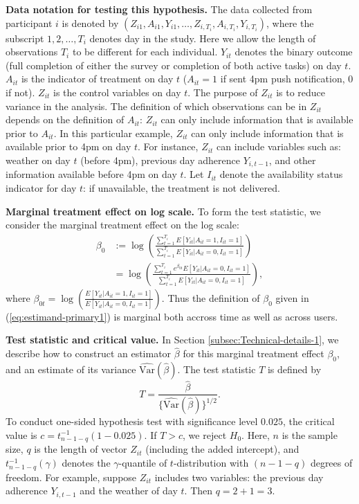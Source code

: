 \documentclass[11pt]{article}
\begin{document}
\textbf{Data notation for testing this hypothesis.} The data collected
from participant $i$ is denoted by $(Z_{i1},A_{i1},Y_{i1},\ldots,Z_{i,T_i},A_{i,T_i},Y_{i,T_i})$,
where the subscript $1,2,\ldots,T_i$ denotes day in the study. Here we allow the length of observations $T_i$ to be different for each individual. $Y_{it}$
denotes the binary outcome (full completion of either the survey or
completion of both active tasks) on day $t$. $A_{it}$ is the indicator
of treatment on day $t$ ($A_{it}=1$ if sent 4pm push notification,
0 if not). $Z_{it}$ is the control variables on day $t$. The purpose
of $Z_{it}$ is to reduce variance in the analysis. The definition
of which observations can be in $Z_{it}$ depends on the definition
of $A_{it}$: $Z_{it}$ can only include information that is available
prior to $A_{it}$. In this particular example, $Z_{it}$ can only
include information that is available prior to 4pm on day $t$. For
instance, $Z_{it}$ can include variables such as: weather on day
$t$ (before 4pm), previous day adherence $Y_{i,t-1}$, and other
information available before 4pm on day $t$. Let $I_{it}$ denote the availability status indicator for day $t$: if unavailable, the treatment is not delivered.

\textbf{Marginal treatment effect on log scale. }To form the test
statistic, we consider the marginal treatment effect on the log scale:
\begin{align}
\beta_{0} & :=\log\left(\frac{\sum_{t=1}^{T_i}E[Y_{it}|A_{it}=1, I_{it} = 1]}{\sum_{t=1}^{T_i}E[Y_{it}|A_{it}=0, I_{it} = 1]}\right)\nonumber \\
 & =\log\left(\frac{\sum_{t=1}^{T_i}e^{\beta_{0t}}E[Y_{it}|A_{it}=0, I_{it} = 1]}{\sum_{t=1}^{T_i}E[Y_{it}|A_{it}=0, I_{it} = 1]}\right),\label{eq:estimand-primary1}
\end{align}
where $\beta_{0t}=\log\left(\frac{E[Y_{it}|A_{it}=1, I_{it} = 1]}{E[Y_{it}|A_{it}=0, I_{it} = 1]}\right)$.
Thus the definition of $\beta_{0}$ given in (\ref{eq:estimand-primary1})
is marginal both accross time as well as across users.

\textbf{Test statistic and critical value.} In Section \ref{subsec:Technical-details-1},
we describe how to construct an estimator $\hat{\beta}$ for this
marginal treatment effect $\beta_{0}$, and an estimate of its variance
$\widehat{\text{Var}}(\hat{\beta})$. The test statistic $T$ is defined
by
\begin{equation}
T=\frac{\hat{\beta}}{\{\widehat{\text{Var}}(\hat{\beta})\}^{1/2}}.\label{eq:test-primary1}
\end{equation}
To conduct one-sided hypothesis test with significance level $0.025$,
the critical value is $c=t_{n-1-q}^{-1}(1-0.025)$. If $T>c$, we
reject $H_{0}$. Here, $n$ is the sample size, $q$ is the length
of vector $Z_{it}$ (including the added intercept), and $t_{n-1-q}^{-1}(\gamma)$
denotes the $\gamma$-quantile of $t$-distribution with $(n-1-q)$
degrees of freedom. For example, suppose $Z_{it}$ includes two variables:
the previous day adherence $Y_{i,t-1}$ and the weather of day $t$.
Then $q=2+1=3$.
\end{document}
